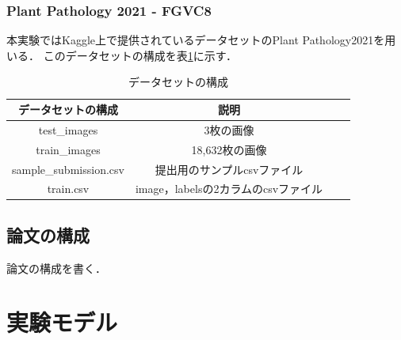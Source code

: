 \documentclass[a4paper, oneside, openany, dvipdfmx]{suribt}%
\newcommand{\tref}[1]{表\ref{#1}}
\begin{document}
\subsection{Plant Pathology 2021 - FGVC8}
本実験ではKaggle上で提供されているデータセットのPlant Pathology2021を用いる．
このデータセットの構成を\tref{tb:dataset}に示す．
\begin{table}[htbp]
  \caption{データセットの構成}
  \label{tb:dataset}
  \centering\begin{tabular}{c|ccc}\hline
    データセットの構成 & 説明\\ \hline
    test\_images & 3枚の画像\\ \hline
    train\_images & 18,632枚の画像\\ \hline
    sample\_submission.csv & 提出用のサンプルcsvファイル\\ \hline
    train.csv & image，labelsの2カラムのcsvファイル\\ \hline
  \end{tabular}
\end{table}
\section{論文の構成}
論文の構成を書く．

\chapter{実験モデル}
\end{document}
